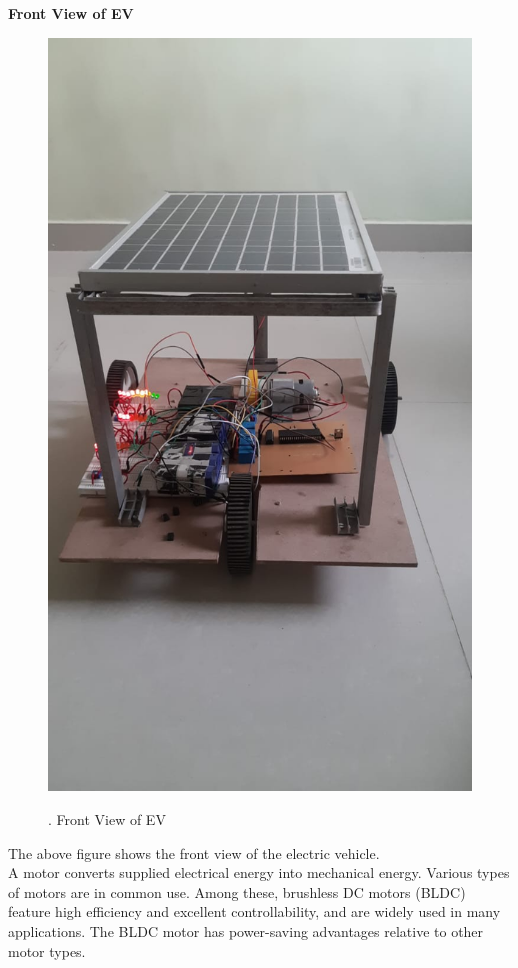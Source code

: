 \documentclass[a4paper,12pt]{article}
\begin{document}
\newpage
\textbf{Front View of EV}\\[1cm]
\begin{figure}[!h]
\centering
\includegraphics[scale=0.3]{fv.jpeg}\\
\caption{. Front View of EV}
\end{figure}

The above figure shows the front view of the electric vehicle.\\
A motor converts supplied electrical energy into mechanical energy. Various types of motors are in common use. Among these, brushless DC motors (BLDC) feature high efficiency and excellent controllability, and are widely used in many applications. The BLDC motor has power-saving advantages relative to other motor types.
\end{document}
